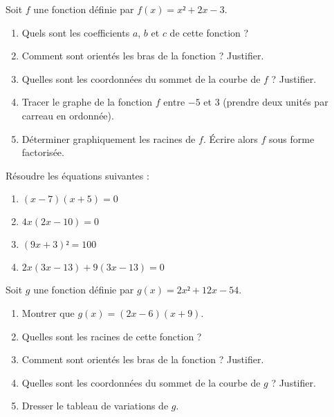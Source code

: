 \documentclass[
	classe=$1^{ere}STI2D$,
	headerTitle=Évaluation\space Chapitre\space 4
]{évaluation}
\begin{document}
\begin{exercice}
	Soit $f$ une fonction définie par $f(x) = x² + 2x - 3$.
	\begin{enumerate}
		\item Quels sont les coefficients $a$, $b$ et $c$ de cette fonction ?
		\item Comment sont orientés les bras de la fonction ? Justifier.
		\item Quelles sont les coordonnées du sommet de la courbe de $f$ ? Justifier.
		\item Tracer le graphe de la fonction $f$ entre $-5$ et $3$ (prendre deux unités par carreau en ordonnée).
		\item Déterminer graphiquement les racines de $f$. Écrire alors $f$ sous forme factorisée.
	\end{enumerate}
\end{exercice}

\begin{exercice}
	Résoudre les équations suivantes :
	\begin{enumerate}
		\item $(x - 7)(x + 5) = 0$
		\item $4x(2x - 10) = 0$
		\item $(9x + 3)² = 100$
		\item $2x(3x - 13) + 9(3x - 13) = 0$
	\end{enumerate}
\end{exercice}

\begin{exercice}
	Soit $g$ une fonction définie par $g(x) = 2x² + 12x - 54$.
	\begin{enumerate}
		\item Montrer que $g(x) = (2x - 6)(x + 9)$.
		\item Quelles sont les racines de cette fonction ?
		\item Comment sont orientés les bras de la fonction ? Justifier.
		\item Quelles sont les coordonnées du sommet de la courbe de $g$ ? Justifier.
		\item Dresser le tableau de variations de $g$.
	\end{enumerate}
\end{exercice}
\end{document}

